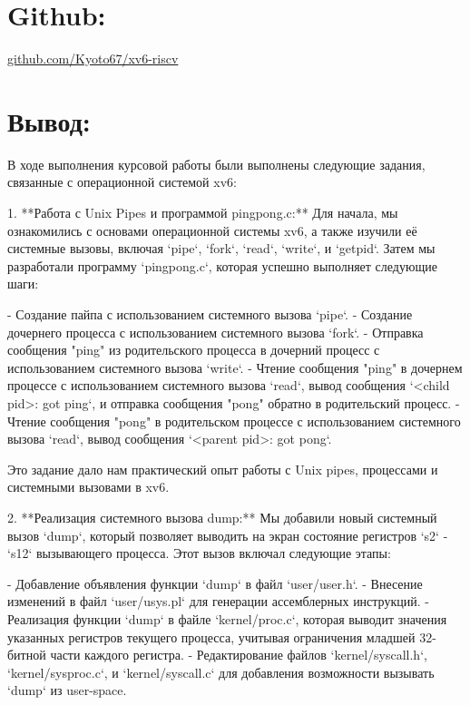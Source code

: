 
\tableofcontents
\BgThispage

\newpage

\BgThispage

\section{Github:}
\href{https://github.com/Kyoto67/xv6-riscv}{github.com/Kyoto67/xv6-riscv}


\section{Вывод:}
    В ходе выполнения курсовой работы были выполнены следующие задания, связанные с операционной системой xv6:

1. **Работа с Unix Pipes и программой pingpong.c:**
   Для начала, мы ознакомились с основами операционной системы xv6, а также изучили её системные вызовы, включая `pipe`, `fork`, `read`, `write`, и `getpid`. Затем мы разработали программу `pingpong.c`, которая успешно выполняет следующие шаги:

   - Создание пайпа с использованием системного вызова `pipe`.
   - Создание дочернего процесса с использованием системного вызова `fork`.
   - Отправка сообщения "ping" из родительского процесса в дочерний процесс с использованием системного вызова `write`.
   - Чтение сообщения "ping" в дочернем процессе с использованием системного вызова `read`, вывод сообщения `<child pid>: got ping`, и отправка сообщения "pong" обратно в родительский процесс.
   - Чтение сообщения "pong" в родительском процессе с использованием системного вызова `read`, вывод сообщения `<parent pid>: got pong`.

   Это задание дало нам практический опыт работы с Unix pipes, процессами и системными вызовами в xv6.

2. **Реализация системного вызова dump:**
   Мы добавили новый системный вызов `dump`, который позволяет выводить на экран состояние регистров `s2` - `s12` вызывающего процесса. Этот вызов включал следующие этапы:

   - Добавление объявления функции `dump` в файл `user/user.h`.
   - Внесение изменений в файл `user/usys.pl` для генерации ассемблерных инструкций.
   - Реализация функции `dump` в файле `kernel/proc.c`, которая выводит значения указанных регистров текущего процесса, учитывая ограничения младшей 32-битной части каждого регистра.
   - Редактирование файлов `kernel/syscall.h`, `kernel/sysproc.c`, и `kernel/syscall.c` для добавления возможности вызывать `dump` из user-space.

